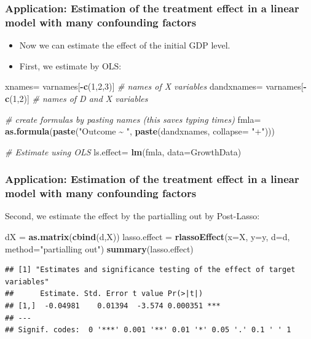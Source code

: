 \documentclass[
  shownotes,
  xcolor={svgnames},
  hyperref={colorlinks,citecolor=DarkBlue,linkcolor=DarkRed,urlcolor=DarkBlue}
  , aspectratio=169]{beamer}
\newenvironment{Shaded}{\begin{snugshade}}{\end{snugshade}}
\newcommand{\CommentTok}[1]{\textcolor[rgb]{0.56,0.35,0.01}{\textit{#1}}}
\newcommand{\DataTypeTok}[1]{\textcolor[rgb]{0.13,0.29,0.53}{#1}}
\newcommand{\DecValTok}[1]{\textcolor[rgb]{0.00,0.00,0.81}{#1}}
\newcommand{\KeywordTok}[1]{\textcolor[rgb]{0.13,0.29,0.53}{\textbf{#1}}}
\newcommand{\NormalTok}[1]{#1}
\newcommand{\OperatorTok}[1]{\textcolor[rgb]{0.81,0.36,0.00}{\textbf{#1}}}
\newcommand{\StringTok}[1]{\textcolor[rgb]{0.31,0.60,0.02}{#1}}
\begin{document}
\begin{frame}[fragile]
\frametitle{Application: Estimation of the treatment effect in a linear model with many confounding factors}

\begin{itemize}
\item Now we can estimate the effect of the initial GDP level. 
\item First, we estimate by OLS:
\end{itemize}


\begin{Shaded}
\begin{Highlighting}[]
\NormalTok{xnames=}\StringTok{ }\NormalTok{varnames[}\OperatorTok{{-}}\KeywordTok{c}\NormalTok{(}\DecValTok{1}\NormalTok{,}\DecValTok{2}\NormalTok{,}\DecValTok{3}\NormalTok{)] }\CommentTok{\# names of X variables}
\NormalTok{dandxnames=}\StringTok{ }\NormalTok{varnames[}\OperatorTok{{-}}\KeywordTok{c}\NormalTok{(}\DecValTok{1}\NormalTok{,}\DecValTok{2}\NormalTok{)] }\CommentTok{\# names of D and X variables}

\CommentTok{\# create formulas by pasting names (this saves typing times)}
\NormalTok{fmla=}\StringTok{ }\KeywordTok{as.formula}\NormalTok{(}\KeywordTok{paste}\NormalTok{(}\StringTok{"Outcome \textasciitilde{} "}\NormalTok{, }\KeywordTok{paste}\NormalTok{(dandxnames, }\DataTypeTok{collapse=} \StringTok{"+"}\NormalTok{)))}

\CommentTok{\# Estimate using OLS}
\NormalTok{ls.effect=}\StringTok{ }\KeywordTok{lm}\NormalTok{(fmla, }\DataTypeTok{data=}\NormalTok{GrowthData)}
\end{Highlighting}
\end{Shaded}

\end{frame}
\begin{frame}[fragile]
\frametitle{Application: Estimation of the treatment effect in a linear model with many confounding factors}

Second, we estimate the effect by the partialling out by Post-Lasso:

\begin{Shaded}
\begin{Highlighting}[]
\NormalTok{dX =}\StringTok{ }\KeywordTok{as.matrix}\NormalTok{(}\KeywordTok{cbind}\NormalTok{(d,X))}
\NormalTok{lasso.effect =}\StringTok{ }\KeywordTok{rlassoEffect}\NormalTok{(}\DataTypeTok{x=}\NormalTok{X, }\DataTypeTok{y=}\NormalTok{y, }\DataTypeTok{d=}\NormalTok{d, }\DataTypeTok{method=}\StringTok{"partialling out"}\NormalTok{)}
\KeywordTok{summary}\NormalTok{(lasso.effect)}
\end{Highlighting}
\end{Shaded}

\begin{verbatim}
## [1] "Estimates and significance testing of the effect of target variables"
##      Estimate. Std. Error t value Pr(>|t|)    
## [1,]  -0.04981    0.01394  -3.574 0.000351 ***
## ---
## Signif. codes:  0 '***' 0.001 '**' 0.01 '*' 0.05 '.' 0.1 ' ' 1
\end{verbatim}

\end{frame}
\end{document}
